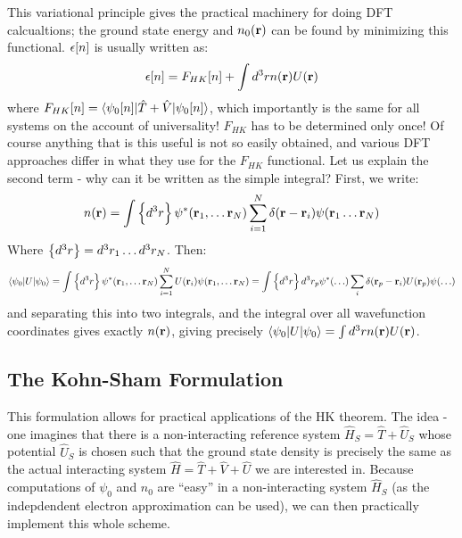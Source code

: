 This variational principle gives the practical machinery for doing DFT calcualtions; the ground state energy and $n_0(\mathbf{r})$ can be found by minimizing this functional. $\epsilon[n]$ is usually written as:
\begin{equation}
    \epsilon[n] = F_{HK}[n] + \int d^3rn(\mathbf{r})U(\mathbf{r})
\end{equation}
where $F_{HK}[n] = \langle \psi_0[n] \rvert\hat{T} + \hat{V}\lvert \psi_0[n] \rangle$, which importantly is the same for all systems on the account of universality! $F_{HK}$ has to be determined only once! Of course anything that is this useful is not so easily obtained, and various DFT approaches differ in what they use for the $F_{HK}$ functional. Let us explain the second term - why can it be written as the simple integral? First, we write:
\begin{align*}
    n(\mathbf{r}) = \int \set{d^3r} \psi^*(\mathbf{r}_1, \ldots \mathbf{r}_N)\sum_{i=1}^N \delta(\mathbf{r} - \mathbf{r}_i)\psi(\mathbf{r}_1 \ldots \mathbf{r}_N)
\end{align*}
Where $\set{d^3r} = d^3r_1\ldots d^3r_N$. Then:
\begin{equation}
    \langle \psi_0 \rvert U\lvert \psi_0 \rangle = \int \set{d^3r}\psi^*(\mathbf{r}_1, \ldots \mathbf{r}_N)\sum_{i=1}^N U(\mathbf{r}_i)\psi(\mathbf{r}_1, \ldots \mathbf{r}_N) = \int \set{d^3r} d^3r_p \psi^*(\ldots)\sum_i \delta(\mathbf{r}_p - \mathbf{r}_i)U(\mathbf{r}_p)\psi(\ldots)
\end{equation}
and separating this into two integrals, and the integral over all wavefunction coordinates gives exactly $n(\mathbf{r})$, giving precisely $ \langle \psi_0 \rvert U\lvert \psi_0 \rangle = \int d^3rn(\mathbf{r})U(\mathbf{r})$.

\subsection{The Kohn-Sham Formulation}
This formulation allows for practical applications of the HK theorem. The idea - one imagines that there is a non-interacting reference system $\hat{H}_S = \hat{T} + \hat{U}_S$ whose potential $\hat{U}_S$ is chosen such that the ground state density is precisely the same as the actual interacting system $\hat{H} = \hat{T} + \hat{V} + \hat{U}$ we are interested in. Because computations of $\psi_0$ and $n_0$ are ``easy'' in a non-interacting system $\hat{H}_S$ (as the indepdendent electron approximation can be used), we can then practically implement this whole scheme.

